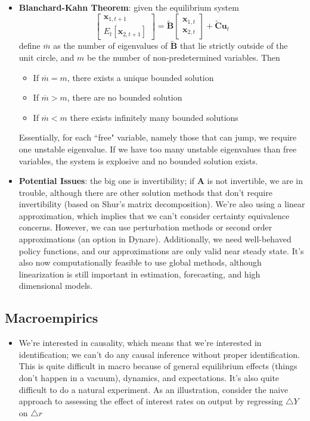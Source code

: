 \documentclass[12pt]{article}
\begin{document}
\begin{itemize}
    \item \textbf{Blanchard-Kahn Theorem}: given the equilibrium system 
    \[\begin{bmatrix}
        \textbf{x}_{1,t+1} \\
        E_t[\textbf{x}_{2,t+1}]
        \end{bmatrix} = \boldsymbol{\widetilde{B}}\begin{bmatrix}
        \textbf{x}_{1,t}\\
        \textbf{x}_{2,t}
        \end{bmatrix} + \boldsymbol{\widetilde{C}}\textbf{u}_t
    \]
    define $\overline{m}$ as the number of eigenvalues of $\boldsymbol{\widetilde{B}}$ that lie strictly outside of the unit circle, and $m$ be the number of non-predetermined variables. Then
    \begin{itemize}
        \item If $\overline{m} = m$, there exists a unique bounded solution
        \item If $\overline{m} > m$, there are no bounded solution
        \item If $\overline{m} < m$ there exists infinitely many bounded solutions
    \end{itemize}
    Essentially, for each ``free" variable, namely those that can jump, we require one unstable eigenvalue. If we have too many unstable eigenvalues than free variables, the system is explosive and no bounded solution exists.
    \item \textbf{Potential Issues}: the big one is invertibility; if $\textbf{A}$ is not invertible, we are in trouble, although there are other solution methods that don't require invertibility (based on Shur's matrix decomposition). We're also using a linear approximation, which implies that we can't consider certainty equivalence concerns. However, we can use perturbation methods or second order approximations (an option in Dynare). Additionally, we need well-behaved policy functions, and our approximations are only valid near steady state. It's also now computationally feasible to use global methods, although linearization is still important in estimation, forecasting, and high dimensional models.
\end{itemize}

\subsection{Macroempirics}

\begin{itemize}
    \item We're interested in causality, which means that we're interested in identification; we can't do any causal inference without proper identification. This is quite difficult in macro because of general equilibrium effects (things don't happen in a vacuum), dynamics, and expectations. It's also quite difficult to do a natural experiment. As an illustration, consider the naive approach to assessing the effect of interest rates on output by regressing $\triangle Y$ on $\triangle r$
\end{itemize}
\end{document}
